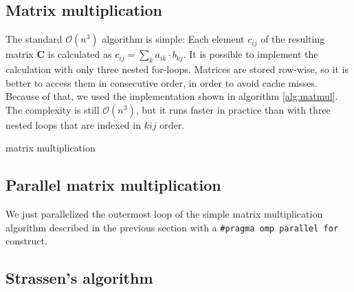 \documentclass{article}
\begin{document}
\subsection{Matrix multiplication}
The standard $\mathcal{O}(n^3)$ algorithm is simple: Each element $c_{ij}$ of 
the resulting matrix $\mathbf{C}$ is calculated as $c_{ij} =\sum_k a_{ik} \cdot b_{kj}$.
It is possible to implement the calculation with only three nested for-loops. Matrices are stored row-wise, so it is better to access them in consecutive order, in order to avoid cache misses.
Because of that, we used the implementation shown in algorithm \ref{alg:matmul}. The complexity is still $\mathcal{O}(n^3)$,
but it runs faster in practice than with three nested loops that are indexed in $kij$ order.

\begin{algorithm}[H] 
\caption{matrix multiplication}
\label{alg:matmul}
\begin{algorithmic}[1]
\Statex
{}
		\EndFor
			\EndFor
		\EndFor
	\EndFor
	\State {}
\EndFunction
\end{algorithmic}
\end{algorithm}

\subsection{Parallel matrix multiplication}
We just parallelized the outermost loop of the simple matrix multiplication algorithm
described in the previous section with a \texttt{\#pragma omp parallel for} construct.

\subsection{Strassen's algorithm}
\end{document}
